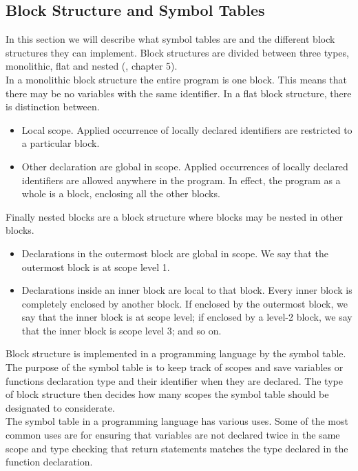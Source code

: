 \subsection{Block Structure and Symbol Tables}
In this section we will describe what symbol tables are and the different block structures they can implement.
Block structures are divided between three types, monolithic, flat and nested (\cite{compilers-and-intepreters}, chapter 5). \\
In a monolithic block structure the entire program is one block. This means that there may be no variables with the same identifier.
In a flat block structure, there is distinction between.
\begin{itemize}
    \item Local scope. Applied occurrence of locally declared identifiers are restricted to a particular block.
    \item Other declaration are global in scope. Applied occurrences of locally declared identifiers are allowed anywhere in the program. 
    In effect, the program as a whole is a block, enclosing all the other blocks.
\end{itemize}
Finally nested blocks are a block structure where blocks may be nested in other blocks. 
\begin{itemize}
    \item Declarations in the outermost block are global in scope. We say that the outermost block is at scope level 1.
    \item Declarations inside an inner block are local to that block. Every inner block is completely enclosed by another block. If enclosed by the outermost block, we say that the inner block is at scope level; if enclosed by a level-2 block, we say that the inner block is scope level 3; and so on.
\end{itemize}
Block structure is implemented in a programming language by the symbol table. The purpose of the symbol table is to keep track of scopes and save variables or functions declaration type and their identifier when they are declared. The type of block structure then decides how many scopes the symbol table should be designated to considerate.\\
The symbol table in a programming language has various uses. Some of the most common uses are for ensuring that variables are not declared twice in the same scope and type checking that return statements matches the type declared in the function declaration.

